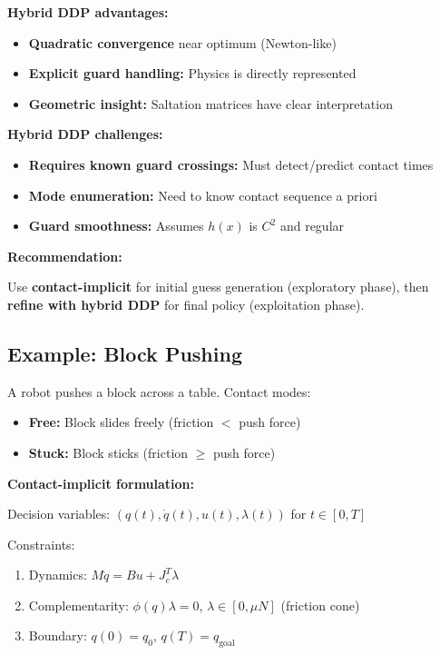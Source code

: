 \documentclass[
  letterpaper,
  DIV=11,
  numbers=noendperiod]{scrartcl}
\providecommand{\tightlist}{%
  \setlength{\itemsep}{0pt}\setlength{\parskip}{0pt}}\usepackage{longtable,booktabs,array}
\begin{document}
\textbf{Hybrid DDP advantages:}

\begin{itemize}
\tightlist
\item
  \textbf{Quadratic convergence} near optimum (Newton-like)
\item
  \textbf{Explicit guard handling:} Physics is directly represented
\item
  \textbf{Geometric insight:} Saltation matrices have clear
  interpretation
\end{itemize}

\textbf{Hybrid DDP challenges:}

\begin{itemize}
\tightlist
\item
  \textbf{Requires known guard crossings:} Must detect/predict contact
  times
\item
  \textbf{Mode enumeration:} Need to know contact sequence a priori
\item
  \textbf{Guard smoothness:} Assumes \(h(x)\) is \(C^2\) and regular
\end{itemize}

\textbf{Recommendation:}

Use \textbf{contact-implicit} for initial guess generation (exploratory
phase), then \textbf{refine with hybrid DDP} for final policy
(exploitation phase).

\subsection{Example: Block Pushing}\label{example-block-pushing}

A robot pushes a block across a table. Contact modes:

\begin{itemize}
\tightlist
\item
  \textbf{Free:} Block slides freely (friction \(<\) push force)
\item
  \textbf{Stuck:} Block sticks (friction \(\geq\) push force)
\end{itemize}

\textbf{Contact-implicit formulation:}

Decision variables: \((q(t), \dot{q}(t), u(t), \lambda(t))\) for
\(t \in [0, T]\)

Constraints:

\begin{enumerate}
\def\labelenumi{\arabic{enumi}.}
\tightlist
\item
  Dynamics: \(M\ddot{q} = Bu + J_c^T \lambda\)
\item
  Complementarity: \(\phi(q) \lambda = 0\), \(\lambda \in [0, \mu N]\)
  (friction cone)
\item
  Boundary: \(q(0) = q_0\), \(q(T) = q_{\text{goal}}\)
\end{enumerate}
\end{document}
